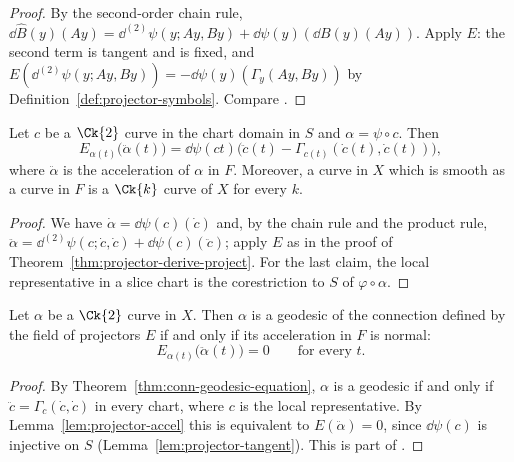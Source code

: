 \begin{proof}
  \leanok
  By the second-order chain rule,
  $\dd\hat B(y)(A y) = \dd^{(2)}\psi(y; A y, B y) + \dd\psi(y)(\dd B(y)(A y))$. Apply $E$: the
  second term is tangent and is fixed, and $E(\dd^{(2)}\psi(y; A y, B y))
  = -\dd\psi(y)(\Gamma_y(A y, B y))$ by Definition~\ref{def:projector-symbols}. Compare
  \cite[\S6.6]{Lar26}.
\end{proof}

\begin{lemma}
  \label{lem:projector-accel}
  \leanok
  Let $c$ be a $\Ck{2}$ curve in the chart domain in $S$ and $\alpha = \psi \circ c$. Then
  \[
    E_{\alpha(t)}\bigl(\ddot\alpha(t)\bigr)
      = \dd\psi(c t)\bigl(\ddot c(t) - \Gamma_{c(t)}(\dot c(t), \dot c(t))\bigr),
  \]
  where $\ddot\alpha$ is the acceleration of $\alpha$ in $F$. Moreover, a curve in $X$ which is
  smooth as a curve in $F$ is a $\Ck{k}$ curve of $X$ for every $k$.
\end{lemma}

\begin{proof}
  \leanok
  We have $\dot\alpha = \dd\psi(c)(\dot c)$ and, by the chain rule and the product rule,
  $\ddot\alpha = \dd^{(2)}\psi(c; \dot c, \dot c) + \dd\psi(c)(\ddot c)$; apply $E$ as in
  the proof of Theorem~\ref{thm:projector-derive-project}. For the last claim, the local
  representative in a slice chart is the corestriction to $S$ of $\varphi \circ \alpha$.
\end{proof}

\begin{theorem}
  \label{thm:projector-geodesics}
  \leanok
  Let $\alpha$ be a $\Ck{2}$ curve in $X$. Then $\alpha$ is a geodesic of the connection defined
  by the field of projectors $E$ if and only if its acceleration in $F$ is normal:
  \[
    E_{\alpha(t)}\bigl(\ddot\alpha(t)\bigr) = 0 \qquad \text{for every } t.
  \]
\end{theorem}

\begin{proof}
  \leanok
  By Theorem~\ref{thm:conn-geodesic-equation}, $\alpha$ is a geodesic if and only if
  $\ddot c = \Gamma_c(\dot c, \dot c)$ in every chart, where $c$ is the local representative. By
  Lemma~\ref{lem:projector-accel} this is equivalent to $E(\ddot\alpha) = 0$, since $\dd\psi(c)$ is
  injective on $S$ (Lemma~\ref{lem:projector-tangent}). This is part of \cite[Teorema~6.6.1]{Lar26}.
\end{proof}

